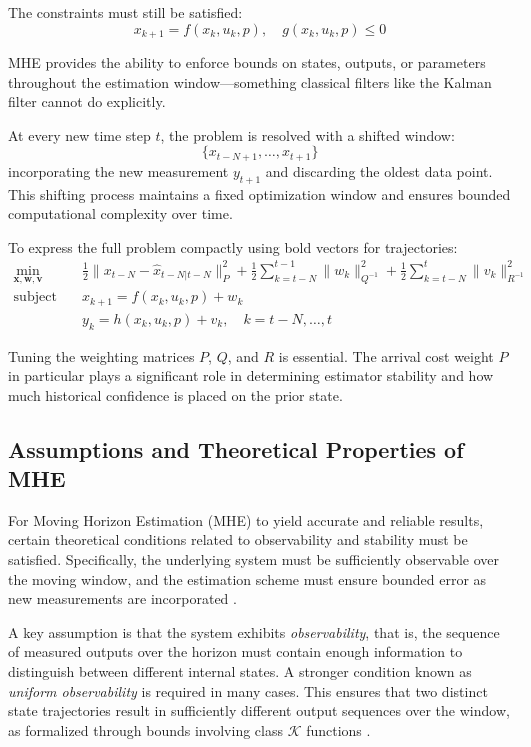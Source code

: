 The constraints must still be satisfied:
\[
x_{k+1} = f(x_k, u_k, p), \quad g(x_k, u_k, p) \leq 0
\]

MHE provides the ability to enforce bounds on states, outputs, or parameters throughout the estimation window—something classical filters like the Kalman filter cannot do explicitly.

At every new time step $t$, the problem is resolved with a shifted window:
\[
\{x_{t-N+1}, \ldots, x_{t+1}\}
\]
incorporating the new measurement $y_{t+1}$ and discarding the oldest data point. This shifting process maintains a fixed optimization window and ensures bounded computational complexity over time.

To express the full problem compactly using bold vectors for trajectories:
\begin{align}
    \min_{\bm{x}, \bm{w}, \bm{v}} \quad & \frac{1}{2} \|x_{t-N} - \hat{x}_{t-N|t-N}\|_P^2 + \frac{1}{2} \sum_{k=t-N}^{t-1} \|w_k\|_{Q^{-1}}^2 + \frac{1}{2} \sum_{k=t-N}^{t} \|v_k\|_{R^{-1}}^2 \\
    \text{subject to} \quad & x_{k+1} = f(x_k, u_k, p) + w_k \\
    & y_k = h(x_k, u_k, p) + v_k, \quad k = t-N, \ldots, t
\end{align}

Tuning the weighting matrices $P$, $Q$, and $R$ is essential. The arrival cost weight $P$ in particular plays a significant role in determining estimator stability and how much historical confidence is placed on the prior state.


\subsection{Assumptions and Theoretical Properties of MHE}

For Moving Horizon Estimation (MHE) to yield accurate and reliable results, certain theoretical conditions related to observability and stability must be satisfied. Specifically, the underlying system must be sufficiently observable over the moving window, and the estimation scheme must ensure bounded error as new measurements are incorporated \cite{ALESSANDRI2025112187}.

A key assumption is that the system exhibits \textit{observability}, that is, the sequence of measured outputs over the horizon must contain enough information to distinguish between different internal states. A stronger condition known as \textit{uniform observability} is required in many cases. This ensures that two distinct state trajectories result in sufficiently different output sequences over the window, as formalized through bounds involving class $\mathcal{K}$ functions \cite{Flayac_2021}.

